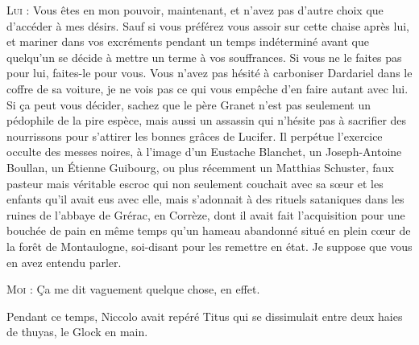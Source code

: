 \begin{dialogue}

\textsc{Lui} : Vous êtes en mon pouvoir, maintenant, et n’avez pas d’autre choix que d’accéder à mes désirs. Sauf si vous préférez vous assoir sur cette chaise après lui, et mariner dans vos excréments pendant un temps indéterminé avant que quelqu’un se décide à mettre un terme à vos souffrances. Si vous ne le faites pas pour lui, faites-le pour vous. Vous n’avez pas hésité à carboniser Dardariel dans le coffre de sa voiture, je ne vois pas ce qui vous empêche d’en faire autant avec lui. Si ça peut vous décider, sachez que le père Granet n’est pas seulement un pédophile de la pire espèce, mais aussi un assassin qui n’hésite pas à sacrifier des nourrissons pour s’attirer les bonnes grâces de Lucifer. Il perpétue l’exercice occulte des messes noires, à l’image d’un Eustache Blanchet, un Joseph-Antoine Boullan, un Étienne Guibourg, ou plus récemment un Matthias Schuster, faux pasteur mais véritable escroc qui non seulement couchait avec sa sœur et les enfants qu’il avait eus avec elle, mais s’adonnait à des rituels sataniques dans les ruines de l’abbaye de Grérac, en Corrèze, dont il avait fait l’acquisition pour une bouchée de pain en même temps qu’un hameau abandonné situé en plein cœur de la forêt de Montaulogne, soi-disant pour les remettre en état. Je suppose que vous en avez entendu parler.

\textsc{Moi} : Ça me dit vaguement quelque chose, en effet.

\end{dialogue}

Pendant ce temps, Niccolo avait repéré Titus qui se dissimulait entre deux haies de thuyas, le Glock en main.

